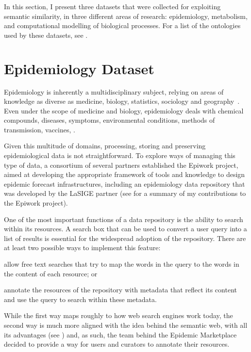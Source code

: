 In this section, I present three datasets that were collected for exploiting semantic similarity, in three different areas of research: epidemiology, metabolism, and computational modelling of biological processes. For a list of the ontologies used by these datasets, see .


\section{Epidemiology Dataset} \label{sec:data/epiwork}

Epidemiology is inherently a multidisciplinary subject, relying on areas of knowledge as diverse as medicine, biology, statistics, sociology and geography~\citep{Porta2008}. Even under the scope of medicine and biology, epidemiology deals with chemical compounds, diseases, symptoms, environmental conditions, methods of transmission, vaccines, \etc.

Given this multitude of domains, processing, storing and preserving epidemiological data is not straightforward. To explore ways of managing this type of data, a consortium of several partners established the Epiwork project, aimed at developing the appropriate framework of tools and knowledge to design epidemic forecast infrastructures, including an epidemiology data repository that was developed by the LaSIGE partner (see  for a summary of my contributions to the Epiwork project).

One of the most important functions of a data repository is the ability to search within its resources. A search box that can be used to convert a user query into a list of results is essential for the widespread adoption of the repository. There are at least two possible ways to implement this feature:
\begin{paralist}
    \item allow free text searches that try to map the words in the query to the words in the content of each resource; or
    \item annotate the resources of the repository with metadata that reflect its content and use the query to search within these metadata.
\end{paralist}
While the first way maps roughly to how web search engines work today, the second way is much more aligned with the idea behind the semantic web, with all its advantages (see ) and, as such, the team behind the Epidemic Marketplace decided to provide a way for users and curators to annotate their resources.

